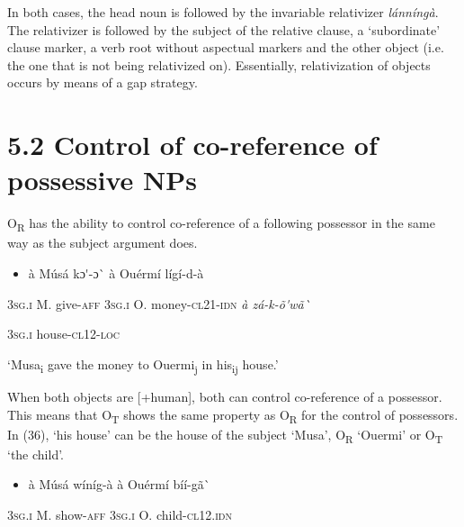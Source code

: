 \documentclass[output=paper]{langsci/langscibook}
\begin{document}
{{{{In both cases, the head noun is followed by the invariable relativizer \textit{l\'{a}nn\'{i}ng\`{a}}. The relativizer is followed by the subject of the relative clause, a ‘subordinate’ clause marker, a verb root without aspectual markers and the other object (i.e. the one that is not being relativized on). Essentially, relativization of objects occurs by means of a gap strategy. 

\section{5.2 Control of co{}-reference of possessive NPs}

O\textsubscript{R} has the ability to control co-reference of a following possessor{ }in the same way as the subject argument does.

\begin{itemize}
\item \begin{styleNumberedEX}
\`{a}    M\'{u}s\'{a}  kɔ\'{ }-ɔ\`{ }  \`{a}    Ou\'{e}rm\'{i}  l\'{i}g\'{i}-d-\`{a}    
\end{styleNumberedEX}\end{itemize}
\begin{styleGloss}
\textsc{3sg.i}  M.  give-\textsc{aff  3sg.i}    O.            money-\textsc{cl21-idn}    \textit{    }\textit{\`{a}    z\'{a}-k-\~{o}\'{ }w\~{a}\`{ }}  
\end{styleGloss}

\begin{styleGloss}
  \textsc{3sg.i  }  house-\textsc{cl12-loc}
\end{styleGloss}

\begin{styleTranslation}
‘Musa\textsubscript{i} gave the money to Ouermi\textsubscript{j} in his\textsubscript{ij} house.’
\end{styleTranslation}

When both objects are [+human], both can control co-reference of a possessor. This means that O\textsubscript{T }shows the same property as O\textsubscript{R} for the control of possessors. In (36), ‘his house’ can be the house of the subject ‘Musa’, O\textsubscript{R} ‘Ouermi’ or O\textsubscript{T} ‘the child’.

\begin{itemize}
\item \begin{styleNumberedEX}
\label{bkm:Ref424318801}\`{a}    M\'{u}s\'{a}  w\'{i}n\'{i}g-\`{a}  \`{a}    Ou\'{e}rm\'{i}  b\'{i}\'{i}-g\~{a}\`{ }    
\end{styleNumberedEX}\end{itemize}
\begin{styleGloss}
\textsc{3sg.i  }  M.  show-\textsc{aff}  \textsc{3sg.i  }  O.    child\textsc{{}-cl12.idn}    
\end{styleGloss}

}}}}
\end{document}

